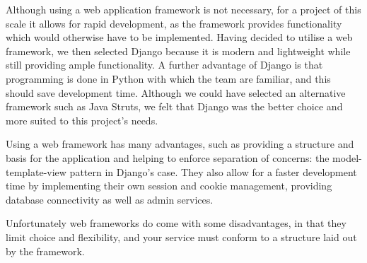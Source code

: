 \documentclass{sig-alt-release2}
\begin{document}
Although using a web application framework is not necessary, for a project of this scale it allows for rapid development, as the framework provides functionality which would otherwise have to be implemented. Having decided to utilise a web framework, we then  selected Django because it is modern and lightweight while still providing ample functionality. A further advantage of Django is that programming is done in Python with which the team are familiar, and this should save development time. Although we could have selected an alternative framework such as Java Struts, we felt that Django was the better choice and more suited to this project's needs. 
 
Using a web framework has many advantages, such as providing a structure and basis for the application and helping to enforce separation of concerns: the model-template-view pattern in Django's case. They also allow for a faster development time by implementing their own session and cookie management, providing database connectivity as well as admin services. 
 
Unfortunately web frameworks do come with some disadvantages, in that they limit choice and flexibility, and your service must conform to a structure laid out by the framework.
\end{document}

